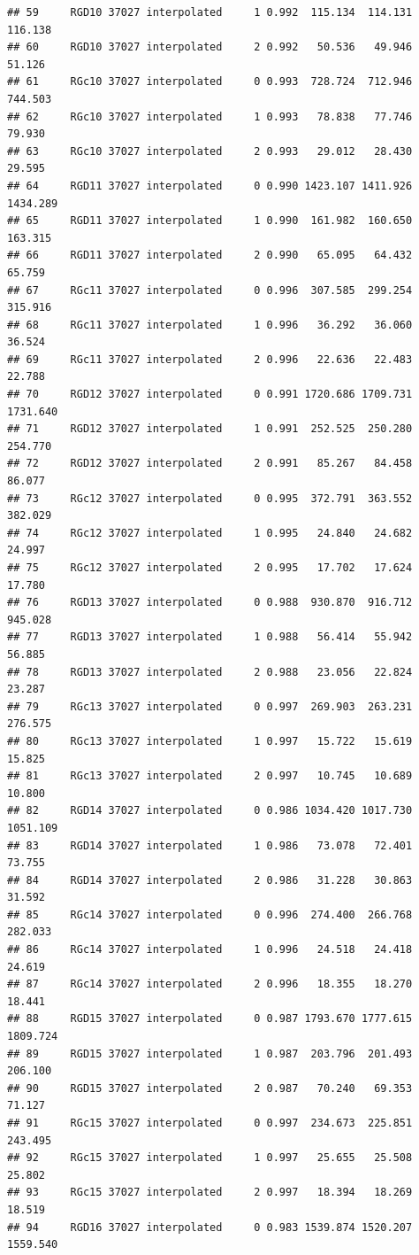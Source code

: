 \documentclass[]{article}
\begin{document}
\begin{verbatim}
## 59     RGD10 37027 interpolated     1 0.992  115.134  114.131  116.138
## 60     RGD10 37027 interpolated     2 0.992   50.536   49.946   51.126
## 61     RGc10 37027 interpolated     0 0.993  728.724  712.946  744.503
## 62     RGc10 37027 interpolated     1 0.993   78.838   77.746   79.930
## 63     RGc10 37027 interpolated     2 0.993   29.012   28.430   29.595
## 64     RGD11 37027 interpolated     0 0.990 1423.107 1411.926 1434.289
## 65     RGD11 37027 interpolated     1 0.990  161.982  160.650  163.315
## 66     RGD11 37027 interpolated     2 0.990   65.095   64.432   65.759
## 67     RGc11 37027 interpolated     0 0.996  307.585  299.254  315.916
## 68     RGc11 37027 interpolated     1 0.996   36.292   36.060   36.524
## 69     RGc11 37027 interpolated     2 0.996   22.636   22.483   22.788
## 70     RGD12 37027 interpolated     0 0.991 1720.686 1709.731 1731.640
## 71     RGD12 37027 interpolated     1 0.991  252.525  250.280  254.770
## 72     RGD12 37027 interpolated     2 0.991   85.267   84.458   86.077
## 73     RGc12 37027 interpolated     0 0.995  372.791  363.552  382.029
## 74     RGc12 37027 interpolated     1 0.995   24.840   24.682   24.997
## 75     RGc12 37027 interpolated     2 0.995   17.702   17.624   17.780
## 76     RGD13 37027 interpolated     0 0.988  930.870  916.712  945.028
## 77     RGD13 37027 interpolated     1 0.988   56.414   55.942   56.885
## 78     RGD13 37027 interpolated     2 0.988   23.056   22.824   23.287
## 79     RGc13 37027 interpolated     0 0.997  269.903  263.231  276.575
## 80     RGc13 37027 interpolated     1 0.997   15.722   15.619   15.825
## 81     RGc13 37027 interpolated     2 0.997   10.745   10.689   10.800
## 82     RGD14 37027 interpolated     0 0.986 1034.420 1017.730 1051.109
## 83     RGD14 37027 interpolated     1 0.986   73.078   72.401   73.755
## 84     RGD14 37027 interpolated     2 0.986   31.228   30.863   31.592
## 85     RGc14 37027 interpolated     0 0.996  274.400  266.768  282.033
## 86     RGc14 37027 interpolated     1 0.996   24.518   24.418   24.619
## 87     RGc14 37027 interpolated     2 0.996   18.355   18.270   18.441
## 88     RGD15 37027 interpolated     0 0.987 1793.670 1777.615 1809.724
## 89     RGD15 37027 interpolated     1 0.987  203.796  201.493  206.100
## 90     RGD15 37027 interpolated     2 0.987   70.240   69.353   71.127
## 91     RGc15 37027 interpolated     0 0.997  234.673  225.851  243.495
## 92     RGc15 37027 interpolated     1 0.997   25.655   25.508   25.802
## 93     RGc15 37027 interpolated     2 0.997   18.394   18.269   18.519
## 94     RGD16 37027 interpolated     0 0.983 1539.874 1520.207 1559.540

\end{verbatim}
\end{document}
